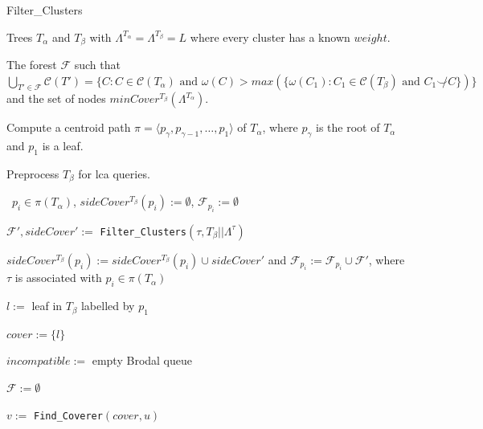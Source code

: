\documentclass[12pt,a4paper]{article}
\newcommand{\compatible}{\smile}
\newcommand{\leafset}{\Lambda}
\newcommand{\weight}{\omega}
\newcommand{\TA}{T_\alpha}
\newcommand{\TB}{T_\beta}
\begin{document}
    \begin{algorithm}[!ht]
        \caption{Filter\_Clusters}
        \label{alg:filterclusters}

        \begin{algorithmic}[1]
            \Input Trees $\TA$ and $\TB$ with $\leafset^{\TA} = \leafset^{\TB} = L$ where every cluster has a known $weight$.

            \Output The forest $\mathcal{F}$ such that $\bigcup_{T' \in \mathcal{F}} \mathcal{C}(T') = \{C : C \in \mathcal{C}(\TA) \text{ and } \weight(C) > max(\{\weight(C_1) : C_1 \in \mathcal{C}(\TB) \text{ and } C_1 \not\compatible C\})\}$ and the set of nodes $minCover^{\TB}(\leafset^{\TA})$.

            \State Compute a centroid path $\pi = \langle p_{\gamma}, p_{\gamma - 1}, \dots, p_1 \rangle$ of $\TA$, where $p_{\gamma}$ is the root of $\TA$ and $p_1$ is a leaf.
            \label{step:centroidpath}

            \State Preprocess $\TB$ for lca queries.
            \label{step:preprocesslca}

            \State \algorithmicforall\ $p_i \in \pi(\TA)$, $sideCover^{\TB}(p_i) := \emptyset$, $\mathcal{F}_{p_i} := \emptyset$

            \ForAll{$\tau \in \sigma(\TA)$}
                \State $\mathcal{F}', sideCover' :=$ \texttt{Filter\_Clusters}$(\tau, \TB||\leafset^{\tau})$
                \label{step:recursivecall}

                \State $sideCover^{\TB}(p_i) := sideCover^{\TB}(p_i) \cup sideCover'$ and $\mathcal{F}_{p_i} := \mathcal{F}_{p_i} \cup \mathcal{F}'$, where $\tau$ is associated with \hspace*{\algorithmicindent}$p_i \in \pi(\TA)$
                \label{step:obtainsidecover}
            \EndFor

            \State $l :=$ leaf in $\TB$ labelled by $p_1$

            \State $cover := \{l\}$
            \label{step:p1cover}

            \State $incompatible :=$ empty Brodal queue
            \label{step:p1incompatible}

            \State $\mathcal{F} := \emptyset$

                \label{step:outerfor}
                \ForAll{$u \in sideCover^{\TB}(p_i)$}
                    \label{step:innerfor}

                    \State $v :=$ \texttt{Find\_Coverer}$(cover, u)$
                    \label{step:findcoverer}


\end{algorithmic}
\end{algorithm}
\end{document}
